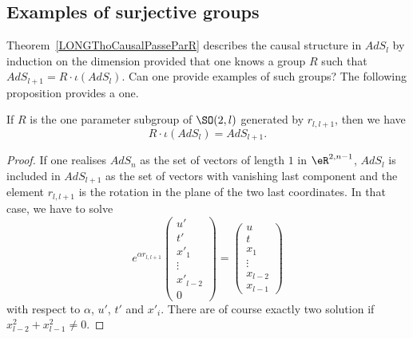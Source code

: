 %
\subsection{Examples of surjective groups}
%

Theorem~\ref{LONGThoCausalPasseParR} describes the causal structure in $AdS_l$ by induction on the dimension provided that one knows a group $R$ such that $AdS_{l+1}=R\cdot \iota(AdS_l)$. Can one provide examples of such groups? The following proposition provides a one.

\begin{proposition}        \label{LONGPropSurjectif}
    If $R$ is the one parameter subgroup of $\SO(2,l)$ generated by $r_{l,l+1}$, then we have
    \begin{equation}
        R\cdot \iota(AdS_l)= AdS_{l+1}.
    \end{equation}
\end{proposition}

%
%
%
%
%
%
%
%
%
%
%
%
%
%
%
%
%
%
%
%
%
%
%
%
%
%
%
%
%
%
%
%
%
%
%
%
%
%
%
%
%
%
%
%

\begin{proof}
    If one realises $AdS_n$ as the set of vectors of length $1$ in $\eR^{2,n-1}$, $AdS_l$ is included in $AdS_{l+1}$ as the set of vectors with vanishing last component and the element $r_{l,l+1}$ is the rotation in the plane of the two last coordinates. In that case, we have to solve
    \begin{equation}
        e^{\alpha r_{l,l+1}}\begin{pmatrix}
            u'    \\
            t'    \\
            x'_1    \\
            \vdots    \\
            x'_{l-2}    \\
            0
        \end{pmatrix}=
        \begin{pmatrix}
            u    \\
            t    \\
            x_1    \\
            \vdots    \\
            x_{l-2}    \\
            x_{l-1}
        \end{pmatrix}
    \end{equation}
    with respect to $\alpha$, $u'$, $t'$ and $x'_i$. There are of course exactly two solution if $x_{l-2}^2+x_{l-1}^2\neq 0$.
\end{proof}

